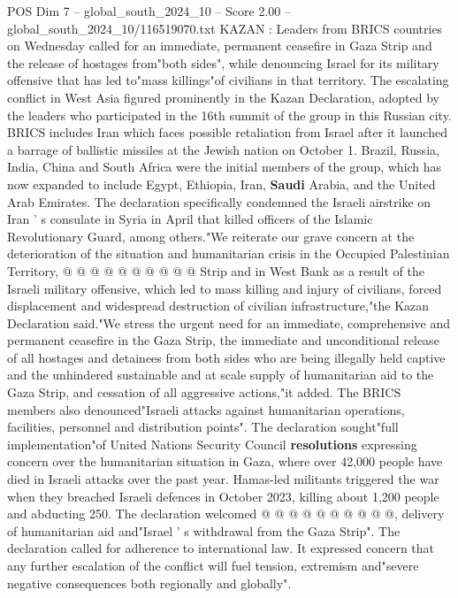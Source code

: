 \begin{textsample}{POS Dim 7 – global\_south\_2024\_10 – Score 2.00 – global\_south\_2024\_10/116519070.txt}  \label{ex:f7_pos_201}
KAZAN : Leaders from BRICS countries on Wednesday called for an immediate, permanent ceasefire in Gaza Strip and the release of hostages from"both sides", while denouncing Israel for its military offensive that has led to"mass killings"of civilians in that territory.
The escalating conflict in West Asia figured prominently in the Kazan Declaration, adopted by the leaders who participated in the 16th summit of the group in this Russian city.
BRICS includes Iran which faces possible retaliation from Israel after it launched a barrage of ballistic missiles at the Jewish nation on October 1.
Brazil, Russia, India, China and South Africa were the initial members of the group, which has now expanded to include Egypt, Ethiopia, Iran, \textbf{Saudi} Arabia, and the United Arab Emirates.
The declaration specifically condemned the Israeli airstrike on Iran ' s consulate in Syria in April that killed officers of the Islamic Revolutionary Guard, among others."We reiterate our grave concern at the deterioration of the situation and humanitarian crisis in the Occupied Palestinian Territory, @ @ @ @ @ @ @ @ @ @ Strip and in West Bank as a result of the Israeli military offensive, which led to mass killing and injury of civilians, forced displacement and widespread destruction of civilian infrastructure,"the Kazan Declaration said."We stress the urgent need for an immediate, comprehensive and permanent ceasefire in the Gaza Strip, the immediate and unconditional release of all hostages and detainees from both sides who are being illegally held captive and the unhindered sustainable and at scale supply of humanitarian aid to the Gaza Strip, and cessation of all aggressive actions,"it added.
The BRICS members also denounced"Israeli attacks against humanitarian operations, facilities, personnel and distribution points".
The declaration sought"full implementation"of United Nations Security Council \textbf{resolutions} expressing concern over the humanitarian situation in Gaza, where over 42,000 people have died in Israeli attacks over the past year.
Hamas-led militants triggered the war when they breached Israeli defences in October 2023, killing about 1,200 people and abducting 250.
The declaration welcomed @ @ @ @ @ @ @ @ @ @, delivery of humanitarian aid and"Israel ' s withdrawal from the Gaza Strip".
The declaration called for adherence to international law.
It expressed concern that any further escalation of the conflict will fuel tension, extremism and"severe negative consequences both regionally and globally".

\end{textsample}
